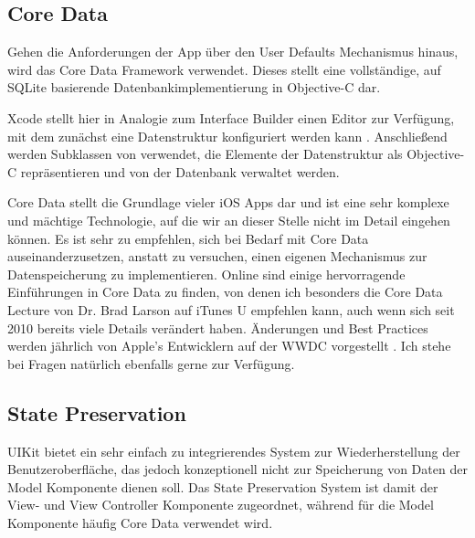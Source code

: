 \documentclass[parskip=half, final]{scrreprt}
\begin{document}
\subsection{Core Data} \label{sec:coredata}

Gehen die Anforderungen der App über den User Defaults Mechanismus hinaus, wird das Core Data Framework verwendet. Dieses stellt eine vollständige, auf SQLite basierende Datenbankimplementierung in Objective-C dar.

Xcode stellt hier in Analogie zum Interface Builder einen Editor zur Verfügung, mit dem zunächst eine Datenstruktur konfiguriert werden kann . Anschließend werden Subklassen von  verwendet, die Elemente der Datenstruktur als Objective-C repräsentieren und von der Datenbank verwaltet werden.


Core Data stellt die Grundlage vieler iOS Apps dar und ist eine sehr komplexe und mächtige Technologie, auf die wir an dieser Stelle nicht im Detail eingehen können. Es ist sehr zu empfehlen, sich bei Bedarf mit Core Data auseinanderzusetzen, anstatt zu versuchen, einen eigenen Mechanismus zur Datenspeicherung zu implementieren. Online sind einige hervorragende Einführungen in Core Data zu finden, von denen ich besonders die Core Data Lecture von Dr. Brad Larson auf iTunes U  empfehlen kann, auch wenn sich seit 2010 bereits viele Details verändert haben. Änderungen und Best Practices werden jährlich von Apple's Entwicklern auf der WWDC vorgestellt . Ich stehe bei Fragen natürlich ebenfalls gerne zur Verfügung.

\subsection{State Preservation}

UIKit bietet ein sehr einfach zu integrierendes System zur Wiederherstellung der Benutzeroberfläche, das jedoch konzeptionell nicht zur Speicherung von Daten der Model Komponente dienen soll. Das State Preservation System ist damit der View- und View Controller Komponente zugeordnet, während für die Model Komponente häufig Core Data verwendet wird.
\end{document}
